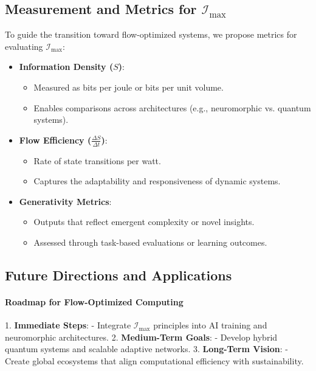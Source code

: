 \documentclass[12pt]{article}
\begin{document}
\subsection{Measurement and Metrics for \(\mathcal{I}_{\text{max}}\)}

To guide the transition toward flow-optimized systems, we propose metrics for evaluating \(\mathcal{I}_{\text{max}}\):
\begin{itemize}
    \item \textbf{Information Density (\(S\))}:
    \begin{itemize}
        \item Measured as bits per joule or bits per unit volume.
        \item Enables comparisons across architectures (e.g., neuromorphic vs. quantum systems).
    \end{itemize}
    \item \textbf{Flow Efficiency (\(\frac{\Delta S}{\Delta t}\))}:
    \begin{itemize}
        \item Rate of state transitions per watt.
        \item Captures the adaptability and responsiveness of dynamic systems.
    \end{itemize}
    \item \textbf{Generativity Metrics}:
    \begin{itemize}
        \item Outputs that reflect emergent complexity or novel insights.
        \item Assessed through task-based evaluations or learning outcomes.
    \end{itemize}
\end{itemize}

\subsection{Future Directions and Applications}

\paragraph{Roadmap for Flow-Optimized Computing}
1. \textbf{Immediate Steps}:
    - Integrate \(\mathcal{I}_{\text{max}}\) principles into AI training and neuromorphic architectures.
2. \textbf{Medium-Term Goals}:
    - Develop hybrid quantum systems and scalable adaptive networks.
3. \textbf{Long-Term Vision}:
    - Create global ecosystems that align computational efficiency with sustainability.
\end{document}
